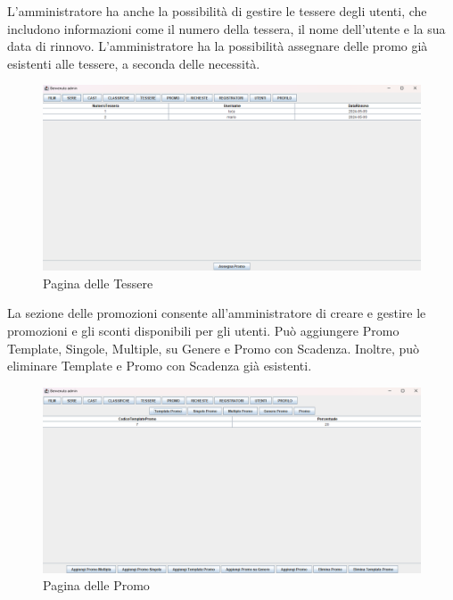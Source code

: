 \documentclass[a4paper,12pt]{report}
\begin{document}
L'amministratore ha anche la possibilità di gestire le tessere degli utenti, che includono informazioni come il numero della tessera, il nome dell'utente e la sua data di rinnovo. L'amministratore ha la possibilità assegnare delle promo già esistenti alle tessere, a seconda delle necessità. \\
\begin{figure}[H]
	\centering
	\includegraphics[width=375pt]{appimg/adminImages/sezionetessere.png}
	\caption{Pagina delle Tessere}
\end{figure}

La sezione delle promozioni consente all'amministratore di creare e gestire le promozioni e gli sconti disponibili per gli utenti. Può aggiungere Promo Template, Singole, Multiple, su Genere e Promo con Scadenza. Inoltre, può eliminare Template e Promo con Scadenza già esistenti. \\
\begin{figure}[H]
	\centering
	\includegraphics[width=375pt]{appimg/adminImages/sezionepromo.png}
	\caption{Pagina delle Promo}
\end{figure}
\end{document}
